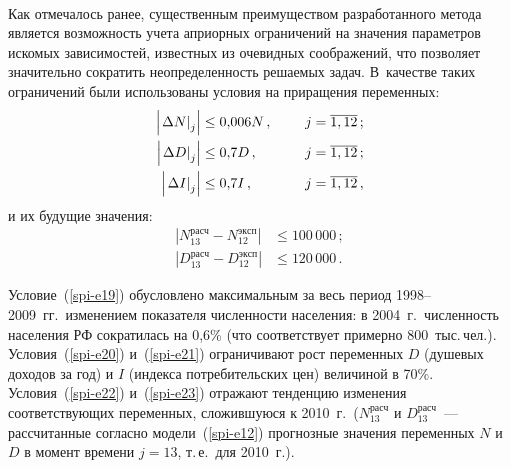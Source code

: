 {\begin{multicols}{2}
\begin{figure*} %
\vspace*{1pt}
\begin{center}
\mbox{%
\epsfxsize=159.578mm
}
\end{center}
\end{figure*}

  Как отмечалось ранее, существенным преимуществом разработанного метода
является возможность учета априорных ограничений на значения параметров
искомых зависимостей, известных из очевидных соображений, что позволяет
значительно сократить неопределенность решаемых задач. В~качестве таких
ограничений были использованы условия на приращения переменных:
  \begin{alignat}{2}
  \left\vert \left. \Delta N\right\vert_j\right\vert &\leq  0{,}006N\,, \quad&&\enskip j
= \overline{1, 12}\,; \label{spi-e19}\\
  \left\vert \left. \Delta D\right\vert_j\right\vert &\leq  0{,}7D\,, &&\enskip j =
\overline{1, 12}\,; \label{spi-e20}\\
  \left\vert \left. \Delta I\right\vert_j\right\vert &\leq  0{,}7I\,, &&\enskip j =
\overline{1, 12}\,, \label{spi-e21}
\end{alignat}
и их будущие значения:
\begin{alignat}{2}
  \left\vert N_{13}^{\mathrm{расч}} - N_{12}^{\mathrm{эксп}}\right\vert & \leq
100\,000\,; \label{spi-e22}\\
  \left\vert D_{13}^{\mathrm{расч}} - D_{12}^{\mathrm{эксп}}\right\vert & \leq
120\,000\,. \label{spi-e23}
  \end{alignat}

  Условие~(\ref{spi-e19}) обусловлено максимальным за весь период
  1998--2009~гг.\ изменением показателя чис\-лен\-ности населения: в 2004~г.\
численность населения РФ сократилась на 0,6\% (что соответствует примерно
800~тыс.\,чел.). Условия~(\ref{spi-e20}) и~(\ref{spi-e21}) ограничивают рост
переменных $D$ (душевых доходов за год) и $I$ (индекса потребительских
цен) величиной в 70\%. Условия~(\ref{spi-e22}) и~(\ref{spi-e23}) отражают
тенденцию изменения соответствующих переменных, сложившуюся к 2010~г.\
($N_{13}^{\mathrm{расч}}$ и $D_{13}^{\mathrm{расч}}$~--- рассчитанные
согласно модели~(\ref{spi-e12}) прогнозные значения переменных $N$ и $D$ в
момент времени $j = 13$, т.\,е.\ для 2010~г.).


\end{multicols}}

